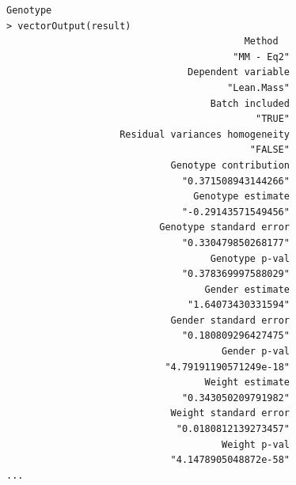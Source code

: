 \documentclass[12pt,a4paper]{article}
\begin{document}
\begingroup
    \fontsize{8pt}{12pt}\selectfont
\begin{verbatim}Genotype
> vectorOutput(result)
                                          Method 
                                        "MM - Eq2" 
                                Dependent variable 
                                       "Lean.Mass" 
                                    Batch included 
                                            "TRUE" 
                    Residual variances homogeneity 
                                           "FALSE" 
                             Genotype contribution 
                               "0.371508943144266" 
                                 Genotype estimate 
                               "-0.29143571549456" 
                           Genotype standard error 
                               "0.330479850268177" 
                                    Genotype p-val 
                               "0.378369997588029" 
                                   Gender estimate 
                                "1.64073430331594" 
                             Gender standard error 
                               "0.180809296427475" 
                                      Gender p-val 
                            "4.79191190571249e-18" 
                                   Weight estimate 
                               "0.343050209791982" 
                             Weight standard error 
                              "0.0180812139273457" 
                                      Weight p-val 
                             "4.1478905048872e-58" 
...
\end{verbatim}
\endgroup
\end{document}
